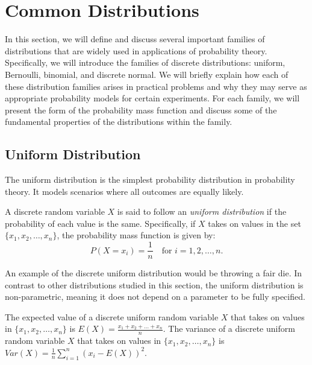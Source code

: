 %
%

\section{Common Distributions}
\label{sec:probability_distributions}

In this section, we will define and discuss several important families of distributions that are widely used in applications of probability theory. Specifically, we will introduce the families of discrete distributions: uniform, Bernoulli, binomial, and discrete normal. We will briefly explain how each of these distribution families arises in practical problems and why they may serve as appropriate probability models for certain experiments. For each family, we will present the form of the probability mass function and discuss some of the fundamental properties of the distributions within the family. 

%
%

\subsection{Uniform Distribution}

The uniform distribution is the simplest probability distribution in probability theory. It models scenarios where all outcomes are equally likely.

\begin{definition}
A discrete random variable $X$ is said to follow an \emph{uniform distribution} if the probability of each value is the same. Specifically, if $X$ takes on values in the set $\{x_1, x_2, \ldots, x_n\}$, the probability mass function is given by:
\[
P(X = x_i) = \frac{1}{n} \quad \text{for } i = 1, 2, \ldots, n.
\]
\end{definition}

An example of the discrete uniform distribution would be throwing a fair die. In contrast to other distributions studied in this section, the uniform distribution is non-parametric, meaning it does not depend on a parameter to be fully specified.

The expected value of a discrete uniform random variable $X$ that takes on values in $\{x_1, x_2, \ldots, x_n\}$ is $E(X) = \frac{x_1 + x_2 + \ldots + x_n}{n}$. The variance of a discrete uniform random variable $X$ that takes on values in $\{x_1, x_2, \ldots, x_n\}$ is $Var(X) = \frac{1}{n} \sum_{i=1}^n (x_i - E(X))^2$.

